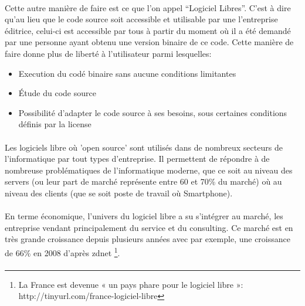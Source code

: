 \paragraph{}

Cette autre manière de faire est ce que l'on appel ``Logiciel Libres''.
C'est à dire qu'au lieu que le code source soit accessible et utilisable
par une l'entreprise éditrice, celui-ci est accessible par tous à
partir du moment où il a été demandé par une personne ayant obtenu
une version binaire de ce code. Cette manière de faire donne plus de
liberté à l'utilisateur parmi lesquelles:

\begin{itemize}

  \item {Execution du codé binaire sans aucune conditions limitantes}

  \item {Étude du code source}

  \item {Possibilité d'adapter le code source à ses besoins, sous
  certaines
    conditions définis par la license}

\end{itemize}

\paragraph {}

Les logiciels libre où 'open source' sont utilisés dans de nombreux
secteurs de l'informatique par tout types d'entreprise. Il permettent
de répondre à de nombreuse problématiques de l'informatique moderne,
que ce soit au niveau des servers (ou leur part de marché représente
entre 60 et 70\% du marché) où au niveau des clients (que se soit
poste de travail où Smartphone).

\paragraph {}

En terme économique, l'univers du logiciel libre a su s'intégrer
au marché, les entreprise vendant principalement du service et du
consulting. Ce marché est en très grande croissance depuis plusieurs
années avec par exemple, une croissance de 66\% en 2008 d'après zdnet
\footnote{La France est devenue « un pays phare pour le logiciel libre
»: http://tinyurl.com/france-logiciel-libre}.

\paragraph{}

